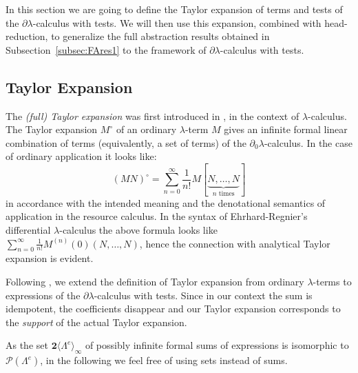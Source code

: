 \documentclass{LMCS}
\newcommand{\bool}{\mathbf{2}}
\newcommand{\Pow}[1]{\cP(#1)}
\newcommand{\dlam}{\ensuremath{\partial\lambda}}
\newcommand{\dzlam}{\ensuremath{\partial_0\lambda}}
\newcommand{\lam}{\ensuremath{\lambda}}
\newcommand{\Set}[1]{\Lambda^{#1}}
\newcommand{\sums}[1]{\bool\langle\Set{#1}\rangle}
\newcommand{\TE}[1]{#1^{\circ}} \newcommand{\at}{\!::\!}
\newcommand{\cP}{\mathcal{P}}
\begin{document}
In this section we are going to define the Taylor expansion of terms 
and tests of the \dlam-calculus with tests.
We will then use this expansion, combined with head-reduction, 
to generalize the full abstraction results obtained in Subsection~\ref{subsec:FAres1} 
to the framework of \dlam-calculus with tests.

\subsection{Taylor Expansion}\label{subsec:TaylorExp}

The \emph{(full) Taylor expansion} was first introduced in \cite{EhrhardR03,EhrhardR06}, in the context of \lam-calculus.
The Taylor expansion $\TE{M}$ of an ordinary \lam-term $M$ gives an infinite formal linear combination of terms
(equivalently, a set of terms) of the \dzlam-calculus. In the case of ordinary application it looks like:
$$
	\TE{(MN)} =\sum_{n=0}^\infty \frac{1}{n!} M[\underbrace{N,\ldots,N}_{n\textrm{ times}}]
$$ 
in accordance with the intended meaning and the denotational semantics
of application in the resource calculus.
In the syntax of Ehrhard-Regnier's differential \lam-calculus the above formula looks like 
$\sum_{n=0}^\infty \frac{1}{n!} M^{(n)}(0)(N,\ldots,N)$,
hence the connection with analytical Taylor expansion is evident.

Following \cite{ManzonettoP11}, we extend the definition of Taylor expansion 
from ordinary \lam-terms to expressions of the \dlam-calculus with tests.
Since in our context the sum is idempotent, the coefficients disappear and our Taylor expansion 
corresponds to the \emph{support} of the actual Taylor expansion.

As the set $\sums{e}_{\infty}$ of possibly infinite formal sums of expressions is isomorphic to $\Pow{\Set{e}}$, 
in the following we feel free of using sets instead of sums.
\end{document}
